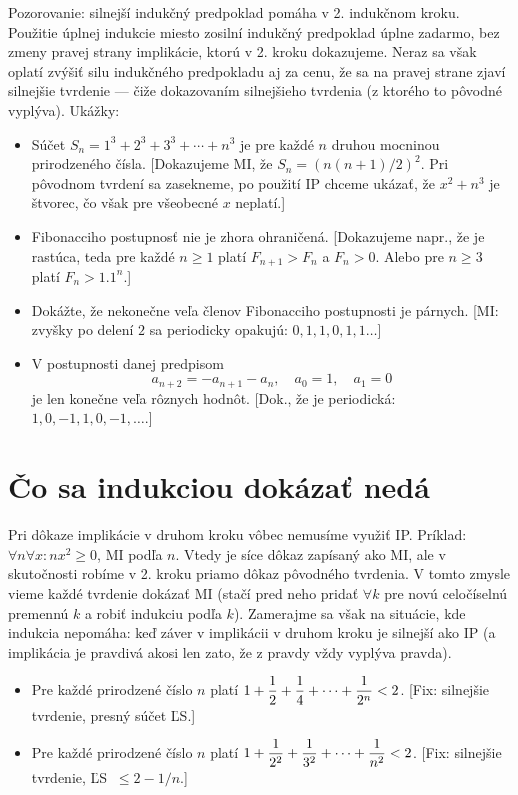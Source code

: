 \documentclass[a4paper, 11pt]{article}
\begin{document}
Pozorovanie: silnejší indukčný predpoklad pomáha v 2. indukčnom kroku. Použitie úplnej indukcie miesto  zosilní indukčný predpoklad úplne zadarmo, bez zmeny pravej strany implikácie, ktorú v 2. kroku dokazujeme. Neraz sa však oplatí zvýšiť silu indukčného predpokladu aj za cenu, že sa na pravej strane zjaví silnejšie tvrdenie --- čiže dokazovaním silnejšieho tvrdenia (z ktorého to pôvodné vyplýva). Ukážky:
\begin{itemize}
\item Súčet $S_n=1^3+2^3+3^3+\cdots+n^3$ je pre každé $n$ druhou mocninou prirodzeného čísla. [Dokazujeme MI, že $S_n=(n(n+1)/2)^2$. Pri pôvodnom tvrdení sa zasekneme, po použití IP chceme ukázať, že $x^2 + n^3$ je štvorec, čo však pre všeobecné $x$ neplatí.]
\item Fibonacciho postupnosť nie je zhora ohraničená. [Dokazujeme napr., že je rastúca, teda pre každé $n\ge 1$ platí $F_{n+1} > F_n$ a $F_n>0$.
    Alebo pre $n\ge 3$ platí $F_n > 1.1^n$.]
\item Dokážte, že nekonečne veľa členov Fibonacciho postupnosti je párnych. [MI: zvyšky po delení $2$ sa periodicky opakujú: $0, 1, 1, 0, 1, 1\dots$]
\item V postupnosti danej predpisom \[
    a_{n+2} = -a_{n+1} - a_n, \quad a_0 = 1, \quad a_1 = 0
\]
je len konečne veľa rôznych hodnôt. [Dok., že je periodická: $1, 0, -1, 1, 0, -1, \dots$.]
\end{itemize}

\section{Čo sa indukciou dokázať nedá}

Pri dôkaze implikácie v druhom kroku vôbec nemusíme využiť IP. Príklad: $\forall n\forall x: nx^2\ge 0$, MI podľa $n$.
Vtedy je síce dôkaz zapísaný ako MI, ale v skutočnosti robíme v 2. kroku priamo dôkaz pôvodného tvrdenia.
V tomto zmysle vieme každé tvrdenie dokázať MI (stačí pred neho pridať $\forall k$ pre novú celočíselnú premennú $k$ a robiť indukciu podľa $k$).
Zamerajme sa však na situácie, kde indukcia nepomáha: keď záver v implikácii v druhom kroku je silnejší ako IP (a implikácia je pravdivá akosi len zato, že z pravdy vždy vyplýva pravda).

\begin{itemize}
\item Pre každé prirodzené číslo $n$ platí $\displaystyle 1+{1\over 2}+{1\over 4}+\cdots+{1\over 2^n} < 2$. [Fix: silnejšie tvrdenie, presný súčet ĽS.]
\item Pre každé prirodzené číslo $n$ platí $\displaystyle 1+{1\over 2^2}+{1\over 3^2}+\cdots+{1\over n^2} < 2$. [Fix: silnejšie tvrdenie, ĽS $\ \le 2-1/n$.]
\end{itemize}
\end{document}
